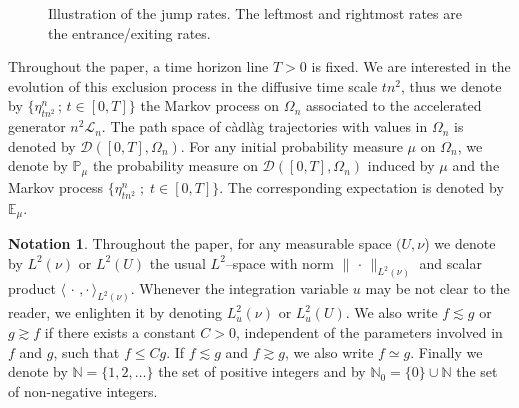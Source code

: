 \documentclass[10pt]{amsart}
\theoremstyle{definition}\newtheorem{defi}[theo]{Definition}\newtheorem{rema}[theo]{Remark}\newtheorem{exam}[theo]{Example}\newtheorem{exem}[theo]{Example}\newtheorem{nota}[theo]{Notation}
\def\centerarc[#1](#2)(#3:#4:#5){\draw[#1] ($(#2)+({#5*cos(#3)},{#5*sin(#3)})$) arc (#3:#4:#5)}
\newcommand{\bb}[1]{{\mathbb #1}}
\renewcommand{\leq}{\leqslant}
\newtheorem*{notas*}{Notation}\NewDocumentEnvironment{enonce*}{ O{} m O{} }{\par\smallskip\noindent\textbf{#2\if\relax\detokenize{#3}\relax\else\ (#3)\fi.}\ }{\par\smallskip}
\begin{document}
\begin{figure}
\centering
{}
\caption{Illustration of the jump rates. The leftmost and rightmost rates are the entrance/exiting rates.}\label{fig1}
\end{figure}

Throughout the paper, a time horizon line $T>0$ is fixed. We are interested in the evolution of this exclusion process in the diffusive time scale $tn^2$, thus we denote by $\{\eta^n_{tn^2}\,; \, t\in [0,T]\}$ the Markov process on $\Omega_n$ associated to the accelerated generator $n^2 \mathcal{L}_n$. The path space of c\`adl\`ag trajectories with values in $\Omega_n$ is denoted by $\mathcal{D}([0,T],\Omega_n)$. For any initial probability measure $\mu$ on $\Omega_n$, we denote by $\bb P_{\mu}$ the probability measure on $\mathcal{D}([0,T],\Omega_n)$ induced by $\mu$ and the Markov process $\{\eta^n_{tn^2}\; ;\; t \in [0,T]\}$. The corresponding expectation is denoted by $\bb E_{\mu}$.

\begin{notas*}
Throughout the paper, for any measurable space $(U,\nu$) we denote by $L^2(\nu)$ or $L^2(U)$ the usual $L^2$--space with norm $\|{\,\cdot\,}\|_{L^2(\nu)}$ and scalar product $\langle {\,\cdot\,,\cdot\,}\rangle_{L^2(\nu)}$. Whenever the integration variable $u$ may be not clear to the reader, we enlighten it by denoting $L_u^2(\nu)$ or $L^2_u(U)$. We also write $f\lesssim g$ or $g \gtrsim f$ if there exists a constant $C>0$, independent of the parameters involved in $f$ and $g$, such that $f \leq Cg$. If $f \lesssim g$ and $f \gtrsim g$, we also write $f \simeq g$. Finally we denote by $\bb N=\{1,2,\dots\}$ the set of positive integers and by $\bb N_0=\{0\}\cup\bb N$ the set of non-negative integers.
\end{notas*}
\end{document}
